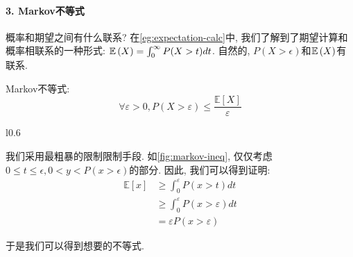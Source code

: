 \paragraph{3. Markov不等式} 概率和期望之间有什么联系? 在\cref{eg:expectation-calc}中, 我们了解到了期望计算和概率相联系的一种形式: $\mathbb E\left(X\right)=\int_0^\infty P(X>t) dt$. 自然的, $P(X>\epsilon)$和$\mathbb E\left(X\right)$有联系. 

\begin{theorem}
    Markov不等式: 
    $$
\forall \varepsilon>0, P(X>\varepsilon) \leq \frac{\mathbb{E}[X]}{\varepsilon}
$$
\end{theorem}

\begin{wrapfigure}{l}{0.6\textwidth}
     
    \caption{Markov不等式限制的方式}
    \label{fig:markov-ineq}
\end{wrapfigure}


我们采用最粗暴的限制限制手段. 如\cref{fig:markov-ineq}, 仅仅考虑$0\leq t\leq \epsilon, 0<y<P(x>\epsilon)$的部分. 因此, 我们可以得到证明: 
$$
\begin{aligned}
\mathbb{E}[x] & \geq \int_0^{\varepsilon} P(x>t) d t \\
& \geq \int_0^{\varepsilon} P(x>\varepsilon) d t \\
& =\varepsilon P(x>\varepsilon)
\end{aligned}
$$

于是我们可以得到想要的不等式. 

